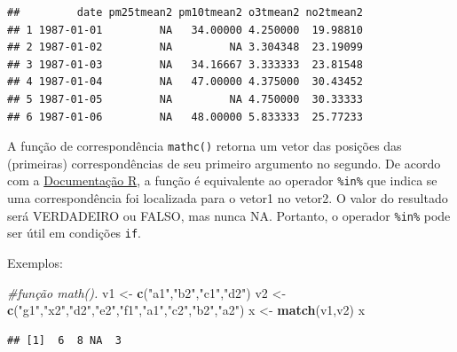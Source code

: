 \documentclass[]{book}
\newenvironment{Shaded}{\begin{snugshade}}{\end{snugshade}}
\newcommand{\CommentTok}[1]{\textcolor[rgb]{0.56,0.35,0.01}{\textit{#1}}}
\newcommand{\KeywordTok}[1]{\textcolor[rgb]{0.13,0.29,0.53}{\textbf{#1}}}
\newcommand{\NormalTok}[1]{#1}
\newcommand{\OperatorTok}[1]{\textcolor[rgb]{0.81,0.36,0.00}{\textbf{#1}}}
\newcommand{\StringTok}[1]{\textcolor[rgb]{0.31,0.60,0.02}{#1}}
\begin{document}
\begin{verbatim}
##         date pm25tmean2 pm10tmean2 o3tmean2 no2tmean2
## 1 1987-01-01         NA   34.00000 4.250000  19.98810
## 2 1987-01-02         NA         NA 3.304348  23.19099
## 3 1987-01-03         NA   34.16667 3.333333  23.81548
## 4 1987-01-04         NA   47.00000 4.375000  30.43452
## 5 1987-01-05         NA         NA 4.750000  30.33333
## 6 1987-01-06         NA   48.00000 5.833333  25.77233
\end{verbatim}

A função de correspondência \texttt{mathc()} retorna um vetor das posições das (primeiras) correspondências de seu primeiro argumento no segundo. De acordo com a \href{https://stat.ethz.ch/R-manual/R-devel/library/base/html/match.html}{Documentação R}, a função é equivalente ao operador \texttt{\%in\%} que indica se uma correspondência foi localizada para o vetor1 no vetor2. O valor do resultado será VERDADEIRO ou FALSO, mas nunca NA. Portanto, o operador \texttt{\%in\%} pode ser útil em condições \texttt{if}.

Exemplos:

\begin{Shaded}
\begin{Highlighting}[]
\CommentTok{#função math().}
\NormalTok{v1 <-}\StringTok{ }\KeywordTok{c}\NormalTok{(}\StringTok{"a1"}\NormalTok{,}\StringTok{"b2"}\NormalTok{,}\StringTok{"c1"}\NormalTok{,}\StringTok{"d2"}\NormalTok{)}
\NormalTok{v2 <-}\StringTok{ }\KeywordTok{c}\NormalTok{(}\StringTok{"g1"}\NormalTok{,}\StringTok{"x2"}\NormalTok{,}\StringTok{"d2"}\NormalTok{,}\StringTok{"e2"}\NormalTok{,}\StringTok{"f1"}\NormalTok{,}\StringTok{"a1"}\NormalTok{,}\StringTok{"c2"}\NormalTok{,}\StringTok{"b2"}\NormalTok{,}\StringTok{"a2"}\NormalTok{)}
\NormalTok{x <-}\StringTok{ }\KeywordTok{match}\NormalTok{(v1,v2)}
\NormalTok{x}
\end{Highlighting}
\end{Shaded}

\begin{verbatim}
## [1]  6  8 NA  3
\end{verbatim}

\begin{Shaded}
\end{Shaded}
\end{document}
